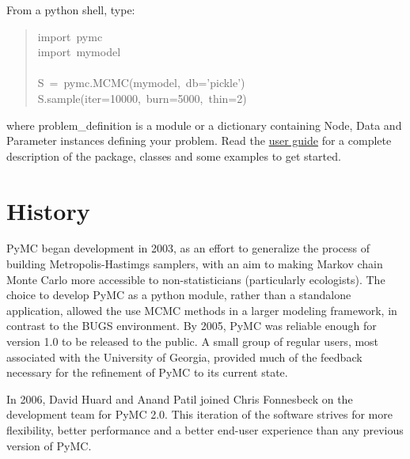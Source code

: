 From a python shell, type:
\begin{quote}{\ttfamily \raggedright \noindent
import~pymc~\\
import~mymodel~\\
~\\
S~=~pymc.MCMC(mymodel,~db='pickle')~\\
S.sample(iter=10000,~burn=5000,~thin=2)
}\end{quote}

where problem{\_}definition is a module or a dictionary containing Node, Data and
Parameter instances defining your problem. Read the \href{docs/pdf/new_interface.pdf}{user guide} for a
complete description of the package, classes and some examples to get started.



\hypertarget{history}{}
\section*{History}
\label{history}

PyMC began development in 2003, as an effort to generalize the process of building Metropolis-Hastimgs samplers, with an aim to making Markov chain Monte Carlo more accessible to non-statisticians (particularly ecologists). The choice to develop PyMC as a python module, rather than a standalone application, allowed the use MCMC methods in a larger modeling framework, in contrast to the BUGS environment. By 2005, PyMC was reliable enough for version 1.0 to be released to the public. A small group of regular users, most associated with the University of Georgia, provided much of the feedback necessary for the refinement of PyMC to its current state.

In 2006, David Huard and Anand Patil joined Chris Fonnesbeck on the development team for PyMC 2.0. This iteration of the software strives for more flexibility, better performance and a better end-user experience than any previous version of PyMC.



\
